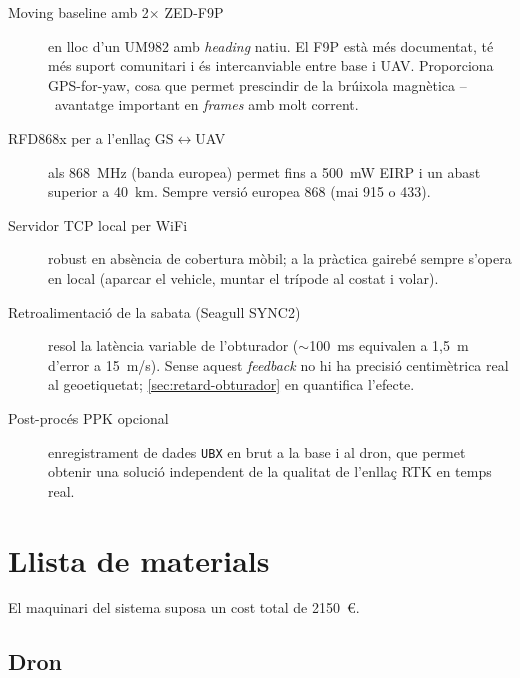 \begin{description}
    \item[Moving baseline amb 2$\times$ ZED-F9P] en lloc d'un UM982 amb \emph{heading} natiu. El F9P està més documentat, té més suport comunitari i és intercanviable entre base i UAV. Proporciona GPS-for-yaw, cosa que permet prescindir de la brúixola magnètica --~avantatge important en \emph{frames} amb molt corrent.
    \item[RFD868x per a l'enllaç GS$\leftrightarrow$UAV] als 868~MHz (banda europea) permet fins a 500~mW EIRP i un abast superior a 40~km. Sempre versió europea 868 (mai 915 o 433).
    \item[Servidor TCP local per WiFi] robust en absència de cobertura mòbil; a la pràctica gairebé sempre s'opera en local (aparcar el vehicle, muntar el trípode al costat i volar).
    \item[Retroalimentació de la sabata (Seagull SYNC2)] resol la latència variable de l'obturador ($\sim$100~ms equivalen a 1,5~m d'error a 15~m/s). Sense aquest \emph{feedback} no hi ha precisió centimètrica real al geoetiquetat; \cref{sec:retard-obturador} en quantifica l'efecte.
    \item[Post-procés PPK opcional] enregistrament de dades \texttt{UBX} en brut a la base i al dron, que permet obtenir una solució independent de la qualitat de l'enllaç RTK en temps real.
\end{description}

\section{Llista de materials}
\label{sec:materials}

El maquinari del sistema suposa un cost total de 2150~€.

\subsection{Dron}

